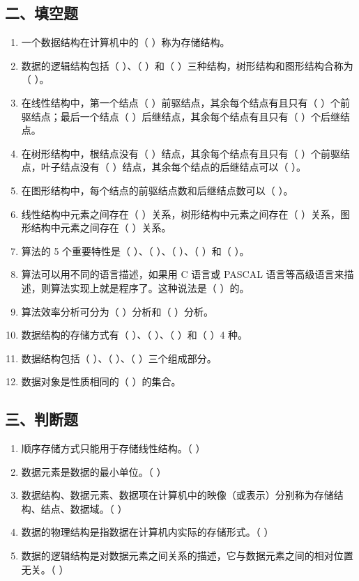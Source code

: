 \documentclass[12pt, a4paper]{article}
\begin{document}
\subsection*{二、填空题}
\begin{enumerate}
    \item 一个数据结构在计算机中的（ ）称为存储结构。
    \item 数据的逻辑结构包括（ ）、（ ）和（ ）三种结构，树形结构和图形结构合称为（ ）。
    \item 在线性结构中，第一个结点（ ）前驱结点，其余每个结点有且只有（ ）个前驱结点；最后一个结点（ ）后继结点，其余每个结点有且只有（ ）个后继结点。
    \item 在树形结构中，根结点没有（ ）结点，其余每个结点有且只有（ ）个前驱结点，叶子结点没有（ ）结点，其余每个结点的后继结点可以（ ）。
    \item 在图形结构中，每个结点的前驱结点数和后继结点数可以（ ）。
    \item 线性结构中元素之间存在（ ）关系，树形结构中元素之间存在（ ）关系，图形结构中元素之间存在（ ）关系。
    \item 算法的 5 个重要特性是（ ）、（ ）、（ ）、（ ）和（ ）。
    \item 算法可以用不同的语言描述，如果用 C 语言或 PASCAL 语言等高级语言来描述，则算法实现上就是程序了。这种说法是（ ）的。
    \item 算法效率分析可分为（ ）分析和（ ）分析。
    \item 数据结构的存储方式有（ ）、（ ）、（ ）和（ ）4 种。
    \item 数据结构包括（ ）、（ ）、（ ）三个组成部分。
    \item 数据对象是性质相同的（ ）的集合。
\end{enumerate}

\subsection*{三、判断题}
\begin{enumerate}
    \item 顺序存储方式只能用于存储线性结构。（ ）
    \item 数据元素是数据的最小单位。（ ）
    \item 数据结构、数据元素、数据项在计算机中的映像（或表示）分别称为存储结构、结点、数据域。（ ）
    \item 数据的物理结构是指数据在计算机内实际的存储形式。（ ）
    \item 数据的逻辑结构是对数据元素之间关系的描述，它与数据元素之间的相对位置无关。（ ）
\end{enumerate}
\end{document}
